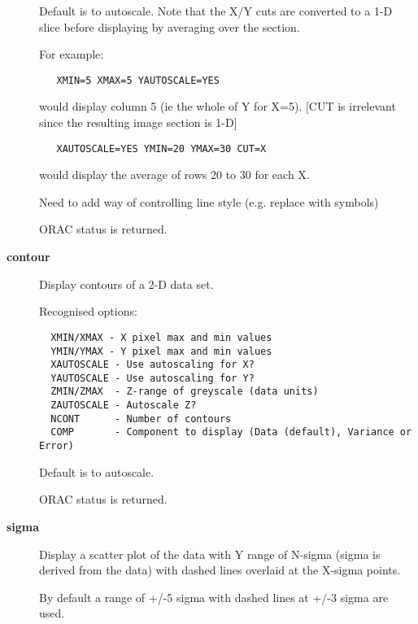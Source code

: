 \begin{description}
Default is to autoscale. Note that the X/Y cuts are converted
to a 1-D slice before displaying by averaging over the section.



For example:

\begin{verbatim}
   XMIN=5 XMAX=5 YAUTOSCALE=YES
\end{verbatim}


would display column 5 (ie the whole of Y for X=5).
[CUT is irrelevant since the resulting image section is 1-D]

\begin{verbatim}
   XAUTOSCALE=YES YMIN=20 YMAX=30 CUT=X
\end{verbatim}


would display the average of rows 20 to 30 for each X.



Need to add way of controlling line style (e.g. replace with symbols)



ORAC status is returned.


\item[\textbf{contour}] \mbox{}

Display contours of a 2-D data set.



Recognised options:

\begin{verbatim}
  XMIN/XMAX - X pixel max and min values
  YMIN/YMAX - Y pixel max and min values
  XAUTOSCALE - Use autoscaling for X?
  YAUTOSCALE - Use autoscaling for Y?
  ZMIN/ZMAX  - Z-range of greyscale (data units)
  ZAUTOSCALE - Autoscale Z?
  NCONT      - Number of contours
  COMP       - Component to display (Data (default), Variance or Error)
\end{verbatim}


Default is to autoscale.



ORAC status is returned.


\item[\textbf{sigma}] \mbox{}

Display a scatter plot of the data with Y range of N-sigma (sigma
is derived from the data) with dashed lines overlaid at the X-sigma
points.



By default a range of +/-5 sigma with dashed lines at +/-3 sigma
are used.




\end{description}
